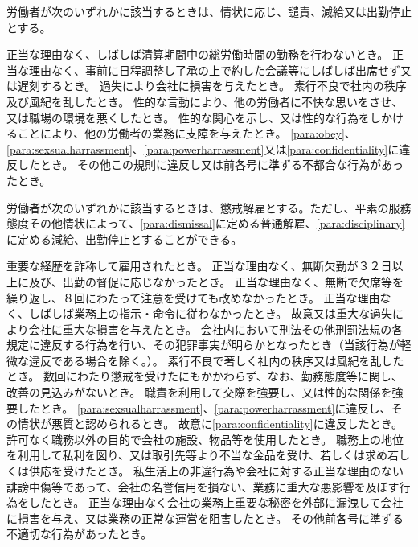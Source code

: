 \documentclass[10pt,a4paper,uplatex]{jsarticle}
\begin{document}
労働者が次のいずれかに該当するときは、情状に応じ、譴責、減給又は出勤停止とする。
\label{para:disciplinary}
\begin{enumerate}
    \itm 正当な理由なく、しばしば清算期間中の総労働時間の勤務を行わないとき。
    \itm 正当な理由なく、事前に日程調整し了承の上で約した会議等にしばしば出席せず又は遅刻するとき。
    \itm 過失により会社に損害を与えたとき。
    \itm 素行不良で社内の秩序及び風紀を乱したとき。
    \itm 性的な言動により、他の労働者に不快な思いをさせ、又は職場の環境を悪くしたとき。
    \itm 性的な関心を示し、又は性的な行為をしかけることにより、他の労働者の業務に支障を与えたとき。
    \itm \ref{para:obey}、\ref{para:sexsualharrassment}、\ref{para:powerharrassment}又は\ref{para:confidentiality}に違反したとき。
    \itm その他この規則に違反し又は前各号に準ずる不都合な行為があったとき。
\end{enumerate}
\term
労働者が次のいずれかに該当するときは、懲戒解雇とする。ただし、平素の服務態度その他情状によって、\ref{para:dismissal}に定める普通解雇、\ref{para:disciplinary}に定める減給、出勤停止とすることができる。
\begin{enumerate}
    \itm 重要な経歴を詐称して雇用されたとき。
    \itm 正当な理由なく、無断欠勤が３２日以上に及び、出勤の督促に応じなかったとき。
    \itm 正当な理由なく、無断で欠席等を繰り返し、８回にわたって注意を受けても改めなかったとき。
    \itm 正当な理由なく、しばしば業務上の指示・命令に従わなかったとき。
    \itm 故意又は重大な過失により会社に重大な損害を与えたとき。
    \itm 会社内において刑法その他刑罰法規の各規定に違反する行為を行い、その犯罪事実が明らかとなったとき（当該行為が軽微な違反である場合を除く。）。
    \itm 素行不良で著しく社内の秩序又は風紀を乱したとき。
    \itm 数回にわたり懲戒を受けたにもかかわらず、なお、勤務態度等に関し、改善の見込みがないとき。
    \itm 職責を利用して交際を強要し、又は性的な関係を強要したとき。
    \itm \ref{para:sexsualharrassment}、\ref{para:powerharrassment}に違反し、その情状が悪質と認められるとき。
    \itm 故意に\ref{para:confidentiality}に違反したとき。
    \itm 許可なく職務以外の目的で会社の施設、物品等を使用したとき。
    \itm 職務上の地位を利用して私利を図り、又は取引先等より不当な金品を受け、若しくは求め若しくは供応を受けたとき。
    \itm 私生活上の非違行為や会社に対する正当な理由のない誹謗中傷等であって、会社の名誉信用を損ない、業務に重大な悪影響を及ぼす行為をしたとき。
    \itm 正当な理由なく会社の業務上重要な秘密を外部に漏洩して会社に損害を与え、又は業務の正常な運営を阻害したとき。
    \itm その他前各号に準ずる不適切な行為があったとき。
\end{enumerate}
\end{document}
